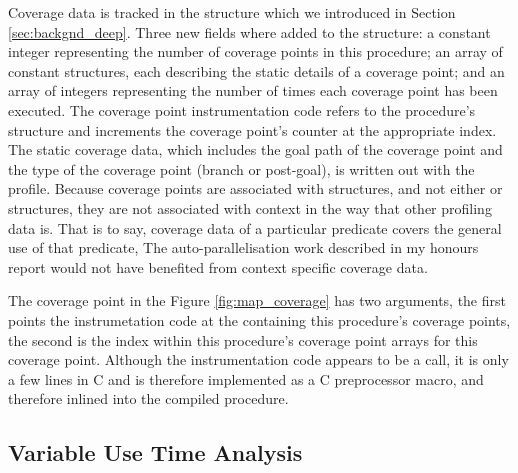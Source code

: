 Coverage data is tracked in the \PS structure
which we introduced in Section \ref{sec:backgnd_deep}.
Three new fields where added to the \PS structure:
a constant integer representing the number of coverage points in this
procedure;
an array of constant structures,
each describing the static details of a coverage point;
and an array of integers representing the number of times each coverage
point has been executed.
The coverage point instrumentation code refers to the procedure's \PS
structure and increments the coverage point's counter at the appropriate index.
The static coverage data,
which includes the goal path of the coverage point and the type of the
coverage point (branch or post-goal),
is written out with the profile.
Because coverage points are associated with \PS structures,
and not either \PD or \CSD structures,
they are not associated with context in the way that other profiling
data is.
That is to say,
coverage data of a particular predicate covers the general use of that
predicate,
The auto-parallelisation work described in my honours report
\citep{pbone_hons}
would not have benefited from context specific coverage data.

The coverage point in the Figure \ref{fig:map_coverage}
has two arguments,
the first points the instrumetation code at the \PS containing
this procedure's coverage points,
the second is the index within this procedure's coverage point arrays
for this coverage point.
Although the instrumentation code appears to be a call,
it is only a few lines in C and is therefore implemented as a C
preprocessor macro, and therefore inlined into the compiled procedure. 


\subsection{Variable Use Time Analysis}
\label{sec:var_use_analysis}



